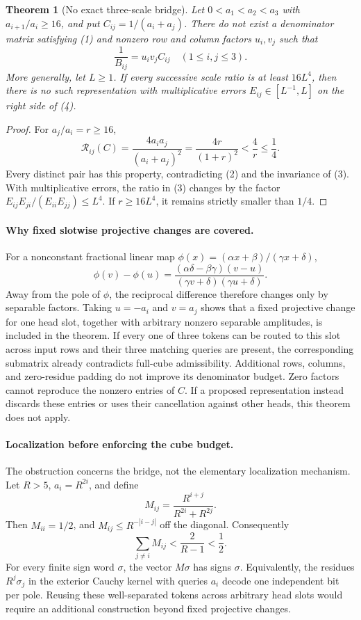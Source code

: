 \documentclass[11pt]{article}
\newtheorem{theorem}{Theorem}
\begin{document}
\begin{theorem}[No exact three-scale bridge]
Let $0<a_1<a_2<a_3$ with $a_{i+1}/a_i\geq16$, and put
$C_{ij}=1/(a_i+a_j)$. There do not exist a denominator matrix satisfying
(1) and nonzero row and column factors $u_i,v_j$ such that
\[
                    \frac1{B_{ij}}=u_i v_j C_{ij}
                       \quad(1\leq i,j\leq3).                \tag{4}
\]
More generally, let $L\geq1$. If every successive scale ratio is at
least $16L^4$, then there is no such representation with multiplicative
errors $E_{ij}\in[L^{-1},L]$ on the right side of (4).
\end{theorem}
\begin{proof}
For $a_j/a_i=r\geq16$,
\[
 \mathcal R_{ij}(C)=\frac{4a_i a_j}{(a_i+a_j)^2}
                   =\frac{4r}{(1+r)^2}<\frac4r\leq\frac14.
                                                               \tag{5}
\]
Every distinct pair has this property, contradicting (2) and the
invariance of (3). With multiplicative errors, the ratio in (3)
changes by the factor $E_{ij}E_{ji}/(E_{ii}E_{jj})\leq L^4$.
If $r\geq16L^4$, it remains strictly smaller than $1/4$.
\end{proof}

\paragraph{Why fixed slotwise projective changes are covered.}
For a nonconstant fractional linear map
$\phi(x)=(\alpha x+\beta)/(\gamma x+\delta)$,
\[
 \phi(v)-\phi(u)
 =\frac{(\alpha\delta-\beta\gamma)(v-u)}
        {(\gamma v+\delta)(\gamma u+\delta)}.                 \tag{6}
\]
Away from the pole of $\phi$, the reciprocal difference therefore
changes only by separable factors. Taking $u=-a_i$ and $v=a_j$
shows that a fixed projective change for one head slot, together with
arbitrary nonzero separable amplitudes, is included in the theorem.
If every one of three tokens can be routed to this slot across input
rows and their three matching queries are present, the corresponding
submatrix already contradicts full-cube admissibility. Additional
rows, columns, and zero-residue padding do not improve its denominator
budget. Zero factors cannot reproduce the nonzero entries of $C$.
If a proposed representation instead discards these entries or uses
their cancellation against other heads, this theorem does not apply.

\paragraph{Localization before enforcing the cube budget.}
The obstruction concerns the bridge, not the elementary localization
mechanism. Let $R>5$, $a_i=R^{2i}$, and define
\[
 M_{ij}=\frac{R^{i+j}}{R^{2i}+R^{2j}}.
\]
Then $M_{ii}=1/2$, and $M_{ij}\leq R^{-|i-j|}$ off the diagonal.
Consequently
\[
 \sum_{j\ne i}M_{ij}<\frac{2}{R-1}<\frac12.                 \tag{7}
\]
For every finite sign word $\sigma$, the vector $M\sigma$ has signs
$\sigma$. Equivalently, the residues $R^j\sigma_j$ in the exterior
Cauchy kernel with queries $a_i$ decode one independent bit per pole.
Reusing these well-separated tokens across arbitrary head slots would
require an additional construction beyond fixed projective changes.
\end{document}
